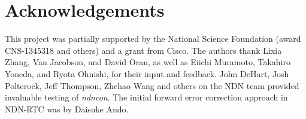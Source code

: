 \documentclass{icn/sig-alternate-2013} %
\newcommand{\ndnrtcName}{NDN-RTC} %
\newcommand{\ndnconName}{\emph{ndncon}}
\begin{document}
\section{Acknowledgements}
\label{sec:Acknowledgements}
This project was partially supported by the National Science Foundation (award CNS-1345318 and others) and a grant from Cisco. The authors thank Lixia Zhang, Van Jacobson, and David Oran, as well as Eiichi Muramoto, Takahiro Yoneda, and Ryota Ohnishi, for their input and feedback. John DeHart, Josh Polterock, Jeff Thompson, Zhehao Wang and others on the NDN team provided invaluable testing of \ndnconName{}.  The initial forward error correction approach in \ndnrtcName{} was by Daisuke Ando. 

\newpage 


{\small

}
\end{document}
